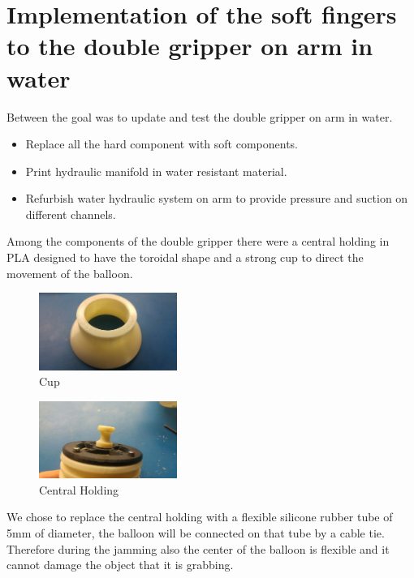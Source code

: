 \documentclass{article}
\begin{document}
 

\newpage

\section{Implementation of the soft fingers to the double gripper on arm in water}
Between the goal was to update and test the double gripper on arm in water.
\begin{itemize}
    \item	Replace all the hard component with soft components.
    \item	Print hydraulic manifold in water resistant material.
    \item	Refurbish water hydraulic system on arm to provide pressure and suction on different channels.
\end{itemize}

Among the components of the double gripper there were a central holding in PLA designed to have the toroidal shape and a strong cup to direct the movement of the balloon.\\
\begin{figure}[h]
    \centering
    \includegraphics[width=0.4\textwidth]{Pictures/fingerOnToroidal/cup.jpg}
    \caption{Cup}
    \label{fig:cup}
\end{figure}

\begin{figure}[h]
    \centering
    \includegraphics[width=0.4\textwidth]{Pictures/fingerOnToroidal/centralHolding.jpg}
    \caption{Central Holding}
    \label{fig:centralHolding}
\end{figure}

We chose to replace the central holding with a flexible silicone rubber tube of 5mm of diameter, the balloon will be connected on that tube by a cable tie. Therefore during the jamming also the center of the balloon is flexible and it cannot damage the object that it is grabbing.
\end{document}
